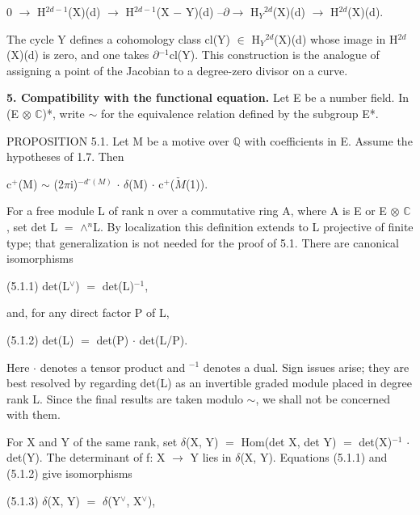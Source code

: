 \documentclass[10pt,twoside]{article}
\newcommand{\SectionLead}[1]{\textbf{\color{D030Accent}#1}}
\begin{document}
0 \ensuremath{→} H\ensuremath{^{2d−1}}(X)(d) \ensuremath{→} H\ensuremath{^{2d−1}}(X \ensuremath{−} Y)(d) --\ensuremath{∂}\ensuremath{→} H\ensuremath{_{Y}}\ensuremath{^{2d}}(X)(d) \ensuremath{→} H\ensuremath{^{2d}}(X)(d).\par
The cycle Y defines a cohomology class cl(Y) \ensuremath{∈} H\ensuremath{_{Y}}\ensuremath{^{2d}}(X)(d) whose image in H\ensuremath{^{2d}}(X)(d) is zero, and one takes \ensuremath{∂}\ensuremath{^{-1}}cl(Y). This construction is the analogue of assigning a point of the Jacobian to a degree-zero divisor on a curve.\par
\SectionLead{5. Compatibility with the functional equation.} Let E be a number field. In (E \ensuremath{⊗} \ensuremath{ℂ})*, write \ensuremath{∼} for the equivalence relation defined by the subgroup E*.\par
PROPOSITION 5.1. Let M be a motive over \ensuremath{ℚ} with coefficients in E. Assume the hypotheses of 1.7. Then\par
c\ensuremath{^{+}}(M) \ensuremath{∼} (2\ensuremath{π}i)\ensuremath{^{−d⁻(M)}} \ensuremath{·} \ensuremath{δ}(M) \ensuremath{·} c\ensuremath{^{+}}(\ensuremath{\check{M}}(1)).\par
For a free module L of rank n over a commutative ring A, where A is E or E \ensuremath{⊗} \ensuremath{ℂ}, set det L \ensuremath{=} \ensuremath{∧}\ensuremath{^{n}}L. By localization this definition extends to L projective of finite type; that generalization is not needed for the proof of 5.1. There are canonical isomorphisms\par
(5.1.1)    det(L\ensuremath{^{∨}}) \ensuremath{=} det(L)\ensuremath{^{-1}},\par
and, for any direct factor P of L,\par
(5.1.2)    det(L) \ensuremath{=} det(P) \ensuremath{·} det(L/P).\par
Here \ensuremath{·} denotes a tensor product and \ensuremath{^{-1}} denotes a dual. Sign issues arise; they are best resolved by regarding det(L) as an invertible graded module placed in degree rank L. Since the final results are taken modulo \ensuremath{∼}, we shall not be concerned with them.\par
For X and Y of the same rank, set \ensuremath{δ}(X, Y) \ensuremath{=} Hom(det X, det Y) \ensuremath{=} det(X)\ensuremath{^{-1}} \ensuremath{·} det(Y). The determinant of f: X \ensuremath{→} Y lies in \ensuremath{δ}(X, Y). Equations (5.1.1) and (5.1.2) give isomorphisms\par
(5.1.3)    \ensuremath{δ}(X, Y) \ensuremath{=} \ensuremath{δ}(Y\ensuremath{^{∨}}, X\ensuremath{^{∨}}),\par
\end{document}
